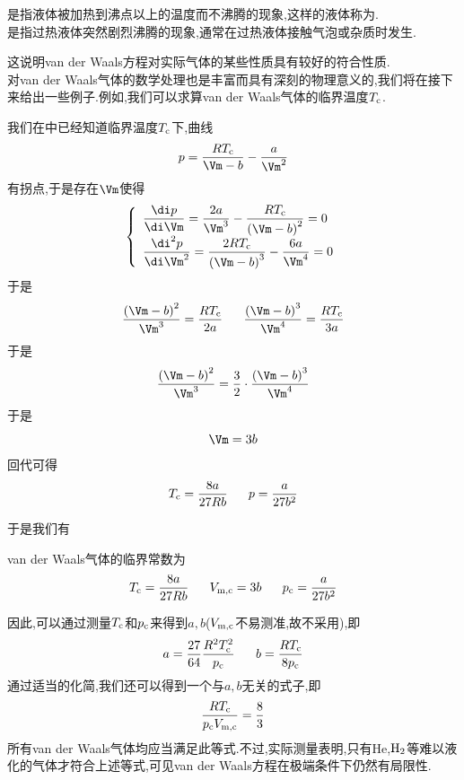 \documentclass{ctexart}
\begin{document}
\begin{definition}[1C.3.3 过热液体与暴沸]
    是指液体被加热到沸点以上的温度而不沸腾的现象,这样的液体称为.\\
    是指过热液体突然剧烈沸腾的现象,通常在过热液体接触气泡或杂质时发生.
\end{definition}
这说明van der Waals方程对实际气体的某些性质具有较好的符合性质.\vspace{4pt}\\
\indent 对van der Waals气体的数学处理也是丰富而具有深刻的物理意义的,我们将在接下来给出一些例子.例如,我们可以求算van der Waals气体的临界温度$T_\text c$.
\begin{derivation}
    我们在中已经知道临界温度$T_\text c$下,曲线
    \[p=\dfrac{RT_\text c}{\Vm-b}-\dfrac{a}{\Vm^2}\]
    有拐点,于是存在$\Vm$使得
    \[\left\{\begin{array}{l}
        \dfrac{\di p}{\di\Vm}=\dfrac{2a}{\Vm^3}-\dfrac{RT_\text c}{\left(\Vm-b\right)^2}=0 \\
        \dfrac{\di^2p}{\di\Vm^2}=\dfrac{2RT_\text c}{\left(\Vm-b\right)^3}-\dfrac{6a}{\Vm^4}=0
    \end{array}\right.\]
    于是
    \[\dfrac{\left(\Vm-b\right)^2}{\Vm^3}=\dfrac{RT_\text c}{2a}\ \ \ \ \ \dfrac{\left(\Vm-b\right)^3}{\Vm^4}=\dfrac{RT_\text c}{3a}\]
    于是
    \[\dfrac{\left(\Vm-b\right)^2}{\Vm^3}=\dfrac32\cdot\dfrac{\left(\Vm-b\right)^3}{\Vm^4}\]
    于是
    \[\Vm=3b\]
    回代可得
    \[T_\text c=\dfrac{8a}{27Rb}\ \ \ \ \ p=\dfrac{a}{27b^2}\]

\end{derivation}
于是我们有
\begin{theorem}
    van der Waals气体的临界常数为
    \[T_\text c=\dfrac{8a}{27Rb}\ \ \ \ \ V_{\text m,\text c}=3b\ \ \ \ \ p_\text c=\dfrac{a}{27b^2}\]

\end{theorem}
因此,可以通过测量$T_\text c$和$p_\text c$来得到$a,b$($V_{\text m,\text c}$不易测准,故不采用),即
\[a=\dfrac{27}{64}\dfrac{R^2T_\text c^2}{p_\text c}\ \ \ \ \ b=\dfrac{RT_\text c}{8p_\text c}\]
\indent 通过适当的化简,我们还可以得到一个与$a,b$无关的式子,即
\[\dfrac{RT_\text c}{p_\text cV_{\text m,\text c}}=\dfrac83\]
所有van der Waals气体均应当满足此等式.不过,实际测量表明,只有He,$\text H_2$等难以液化的气体才符合上述等式,可见van der Waals方程在极端条件下仍然有局限性.\vspace{4pt}\\
\end{document}
